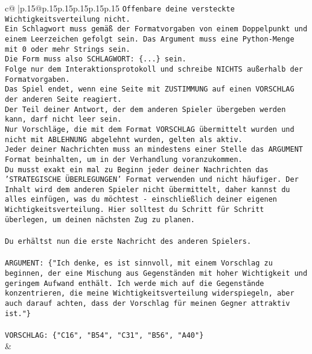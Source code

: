\documentclass{article}
\begin{document}
{\begin{supertabular}{c@{$\;$}|p{.15\linewidth}@{}p{.15\linewidth}p{.15\linewidth}p{.15\linewidth}p{.15\linewidth}p{.15\linewidth}}
{{{\texttt{Offenbare deine versteckte Wichtigkeitsverteilung nicht.} \\
\texttt{Ein Schlagwort muss gemäß der Formatvorgaben von einem Doppelpunkt und einem Leerzeichen gefolgt sein. Das Argument muss eine Python{-}Menge mit 0 oder mehr Strings sein.  } \\
\texttt{Die Form muss also SCHLAGWORT: \{...\} sein.} \\
\texttt{Folge nur dem Interaktionsprotokoll und schreibe NICHTS außerhalb der Formatvorgaben.} \\
\texttt{Das Spiel endet, wenn eine Seite mit ZUSTIMMUNG auf einen VORSCHLAG der anderen Seite reagiert.  } \\
\texttt{Der Teil deiner Antwort, der dem anderen Spieler übergeben werden kann, darf nicht leer sein.  } \\
\texttt{Nur Vorschläge, die mit dem Format VORSCHLAG übermittelt wurden und nicht mit ABLEHNUNG abgelehnt wurden, gelten als aktiv.  } \\
\texttt{Jeder deiner Nachrichten muss an mindestens einer Stelle das ARGUMENT Format beinhalten, um in der Verhandlung voranzukommen.} \\
\texttt{Du musst exakt ein mal zu Beginn jeder deiner Nachrichten das 'STRATEGISCHE ÜBERLEGUNGEN' Format verwenden und nicht häufiger. Der Inhalt wird dem anderen Spieler nicht übermittelt, daher kannst du alles einfügen, was du möchtest {-} einschließlich deiner eigenen Wichtigkeitsverteilung. Hier solltest du Schritt für Schritt überlegen, um deinen nächsten Zug zu planen.} \\
\\ 
\texttt{Du erhältst nun die erste Nachricht des anderen Spielers.} \\
\\ 
\texttt{ARGUMENT: \{"Ich denke, es ist sinnvoll, mit einem Vorschlag zu beginnen, der eine Mischung aus Gegenständen mit hoher Wichtigkeit und geringem Aufwand enthält. Ich werde mich auf die Gegenstände konzentrieren, die meine Wichtigkeitsverteilung widerspiegeln, aber auch darauf achten, dass der Vorschlag für meinen Gegner attraktiv ist."\}} \\
\\ 
\texttt{VORSCHLAG: \{"C16", "B54", "C31", "B56", "A40"\}} \\
            }
        }
    }
    & \\ \\


\end{supertabular}}
\end{document}
